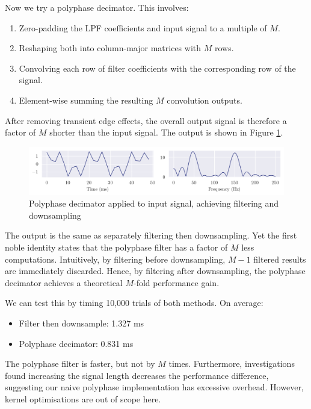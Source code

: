 Now we try a polyphase decimator. This involves:
\begin{enumerate}
    \item Zero-padding the LPF coefficients and input signal to a multiple of $M$.
    \item Reshaping both into column-major matrices with $M$ rows.
    \item Convolving each row of filter coefficients with the corresponding row of the signal.
    \item Element-wise summing the resulting $M$ convolution outputs.
\end{enumerate}
After removing transient edge effects, the overall output signal is therefore a factor of $M$ shorter than the input signal. The output is shown in Figure \ref{fig:q1_polydecimate}.

\newpage

\begin{figure}[ht]
    \centering
    \includegraphics[width=\textwidth]{images/q1_polydecimate.png}
    \caption{Polyphase decimator applied to input signal, achieving filtering and downsampling}
    \label{fig:q1_polydecimate}
\end{figure}

The output is the same as separately filtering then downsampling. Yet the first noble identity states that the polyphase filter has a factor of $M$ less computations. Intuitively, by filtering before downsampling, $M-1$ filtered results are immediately discarded. Hence, by filtering after downsampling, the polyphase decimator achieves a theoretical $M$-fold performance gain.

We can test this by timing 10,000 trials of both methods. On average:
\begin{itemize}
    \item Filter then downsample: 1.327 ms
    \item Polyphase decimator: 0.831 ms
\end{itemize}
The polyphase filter is faster, but not by $M$ times. Furthermore, investigations found increasing the signal length decreases the performance difference, suggesting our naive polyphase implementation has excessive overhead. However, kernel optimisations are out of scope here.
